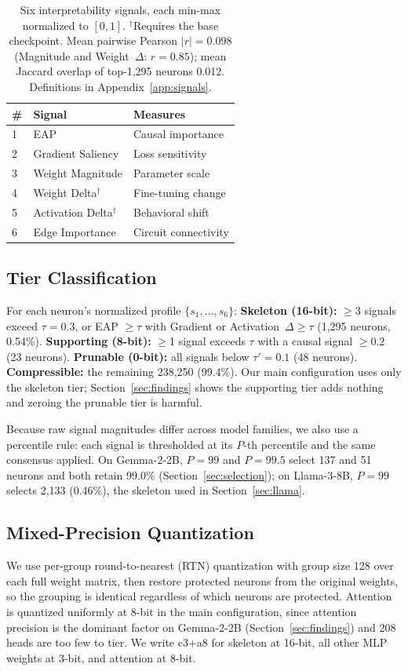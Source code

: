 \documentclass[11pt]{article}
\begin{document}
\begin{table}[t]
\centering
\small
\begin{tabular}{lll}
\toprule
\textbf{\#} & \textbf{Signal} & \textbf{Measures} \\
\midrule
1 & EAP \cite{syed2023attributionpatchingoutperformsautomated} & Causal importance \\
2 & Gradient Saliency & Loss sensitivity \\
3 & Weight Magnitude & Parameter scale \\
4 & Weight Delta$^\dagger$ & Fine-tuning change \\
5 & Activation Delta$^\dagger$ & Behavioral shift \\
6 & Edge Importance & Circuit connectivity \\
\bottomrule
\end{tabular}
\caption{Six interpretability signals, each min-max normalized 
to $[0,1]$. $^\dagger$Requires the base checkpoint. Mean 
pairwise Pearson $|r|{=}0.098$ (Magnitude and Weight~$\Delta$: 
$r{=}0.85$); mean Jaccard overlap of top-1,295 neurons 0.012. 
Definitions in Appendix~\ref{app:signals}.}
\label{tab:signals}
\end{table}

\subsection{Tier Classification}
\label{sec:tiers}

For each neuron's normalized profile $\{s_1, \ldots, s_6\}$: 
\textbf{Skeleton (16-bit):} $\geq$3 signals exceed 
$\tau{=}0.3$, or EAP $\geq \tau$ with Gradient or 
Activation~$\Delta \geq \tau$ (1,295 neurons, 0.54\%). 
\textbf{Supporting (8-bit):} $\geq$1 signal exceeds $\tau$ with 
a causal signal $\geq 0.2$ (23 neurons). 
\textbf{Prunable (0-bit):} all signals below $\tau'{=}0.1$ 
(48 neurons). \textbf{Compressible:} the remaining 238,250 
(99.4\%). Our main configuration uses only the skeleton tier; 
Section~\ref{sec:findings} shows the supporting tier adds 
nothing and zeroing the prunable tier is harmful.

Because raw signal magnitudes differ across model families, we 
also use a percentile rule: each signal is thresholded at its 
$P$-th percentile and the same consensus applied. On 
Gemma-2-2B, $P{=}99$ and $P{=}99.5$ select 137 and 51 neurons 
and both retain 99.0\% (Section~\ref{sec:selection}); on 
Llama-3-8B, $P{=}99$ selects 2,133 (0.46\%), the skeleton used 
in Section~\ref{sec:llama}.
\subsection{Mixed-Precision Quantization}
\label{sec:quant}
We use per-group round-to-nearest (RTN) quantization with group 
size 128 over each full weight matrix, then restore protected 
neurons from the original weights, so the grouping is identical 
regardless of which neurons are protected. Attention is 
quantized uniformly at 8-bit in the main configuration, since 
attention precision is the dominant factor on Gemma-2-2B 
(Section~\ref{sec:findings}) and 208 heads are too few to tier. 
We write c3+a8 for skeleton at 16-bit, all other MLP weights at 
3-bit, and attention at 8-bit.
\end{document}
